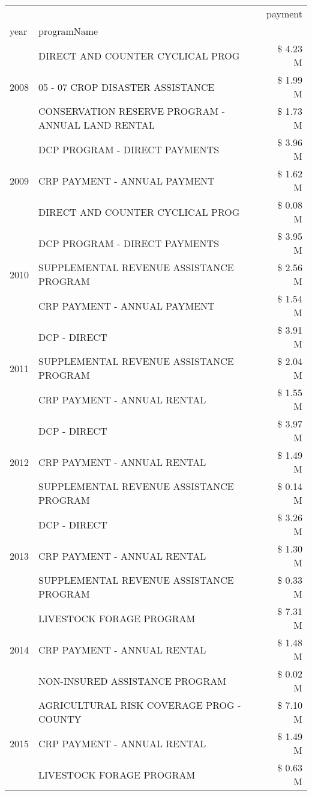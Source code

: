 \begin{tabular}{llr}
\toprule
 &  & payment \\
year & programName &  \\
\midrule
\multirow[t]{3}{*}{2008} & DIRECT AND COUNTER CYCLICAL PROG & \$ 4.23 M \\
 & 05 - 07 CROP DISASTER ASSISTANCE & \$ 1.99 M \\
 & CONSERVATION RESERVE PROGRAM - ANNUAL LAND RENTAL & \$ 1.73 M \\
\cline{1-3}
\multirow[t]{3}{*}{2009} & DCP PROGRAM - DIRECT PAYMENTS & \$ 3.96 M \\
 & CRP PAYMENT - ANNUAL PAYMENT & \$ 1.62 M \\
 & DIRECT AND COUNTER CYCLICAL PROG & \$ 0.08 M \\
\cline{1-3}
\multirow[t]{3}{*}{2010} & DCP PROGRAM - DIRECT PAYMENTS & \$ 3.95 M \\
 & SUPPLEMENTAL REVENUE ASSISTANCE PROGRAM & \$ 2.56 M \\
 & CRP PAYMENT - ANNUAL PAYMENT & \$ 1.54 M \\
\cline{1-3}
\multirow[t]{3}{*}{2011} & DCP - DIRECT & \$ 3.91 M \\
 & SUPPLEMENTAL REVENUE ASSISTANCE PROGRAM & \$ 2.04 M \\
 & CRP PAYMENT - ANNUAL RENTAL & \$ 1.55 M \\
\cline{1-3}
\multirow[t]{3}{*}{2012} & DCP - DIRECT & \$ 3.97 M \\
 & CRP PAYMENT - ANNUAL RENTAL & \$ 1.49 M \\
 & SUPPLEMENTAL REVENUE ASSISTANCE PROGRAM & \$ 0.14 M \\
\cline{1-3}
\multirow[t]{3}{*}{2013} & DCP - DIRECT & \$ 3.26 M \\
 & CRP PAYMENT - ANNUAL RENTAL & \$ 1.30 M \\
 & SUPPLEMENTAL REVENUE ASSISTANCE PROGRAM & \$ 0.33 M \\
\cline{1-3}
\multirow[t]{3}{*}{2014} & LIVESTOCK FORAGE PROGRAM & \$ 7.31 M \\
 & CRP PAYMENT - ANNUAL RENTAL & \$ 1.48 M \\
 & NON-INSURED ASSISTANCE PROGRAM & \$ 0.02 M \\
\cline{1-3}
\multirow[t]{3}{*}{2015} & AGRICULTURAL RISK COVERAGE PROG - COUNTY & \$ 7.10 M \\
 & CRP PAYMENT - ANNUAL RENTAL & \$ 1.49 M \\
 & LIVESTOCK FORAGE PROGRAM & \$ 0.63 M \\
\cline{1-3}

\end{tabular}
